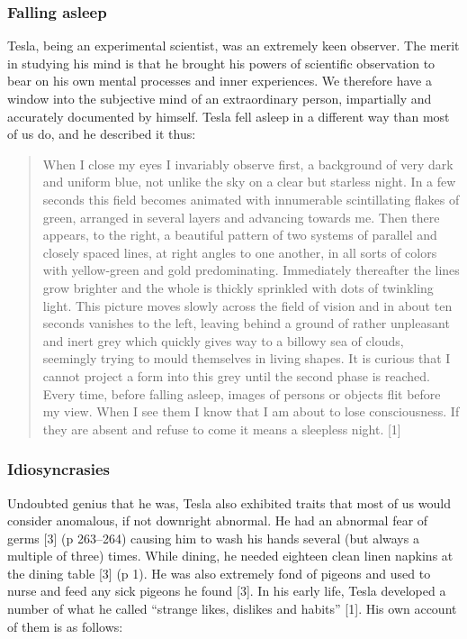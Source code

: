 \documentclass[
  12pt,
  british,
  a4paper,
]{article}
\begin{document}
\hypertarget{falling-asleep}{%
\subsubsection{Falling asleep}\label{falling-asleep}}

Tesla, being an experimental scientist, was an extremely keen observer.
The merit in studying his mind is that he brought his powers of
scientific observation to bear on his own mental processes and inner
experiences. We therefore have a window into the subjective mind of an
extraordinary person, impartially and accurately documented by himself.
Tesla fell asleep in a different way than most of us do, and he
described it thus:

\begin{quote}
When I close my eyes I invariably observe first, a background of very
dark and uniform blue, not unlike the sky on a clear but starless night.
In a few seconds this field becomes animated with innumerable
scintillating flakes of green, arranged in several layers and advancing
towards me. Then there appears, to the right, a beautiful pattern of two
systems of parallel and closely spaced lines, at right angles to one
another, in all sorts of colors with yellow-green and gold
predominating. Immediately thereafter the lines grow brighter and the
whole is thickly sprinkled with dots of twinkling light. This picture
moves slowly across the field of vision and in about ten seconds
vanishes to the left, leaving behind a ground of rather unpleasant and
inert grey which quickly gives way to a billowy sea of clouds, seemingly
trying to mould themselves in living shapes. It is curious that I cannot
project a form into this grey until the second phase is reached. Every
time, before falling asleep, images of persons or objects flit before my
view. When I see them I know that I am about to lose consciousness. If
they are absent and refuse to come it means a sleepless night. {[}1{]}
\end{quote}

\hypertarget{idiosyncrasies}{%
\subsubsection{Idiosyncrasies}\label{idiosyncrasies}}

Undoubted genius that he was, Tesla also exhibited traits that most of
us would consider anomalous, if not downright abnormal. He had an
abnormal fear of germs {[}3{]} (p 263--264) causing him to wash his
hands several (but always a multiple of three) times. While dining, he
needed eighteen clean linen napkins at the dining table {[}3{]} (p 1).
He was also extremely fond of pigeons and used to nurse and feed any
sick pigeons he found {[}3{]}. In his early life, Tesla developed a
number of what he called ``strange likes, dislikes and habits'' {[}1{]}.
His own account of them is as follows:
\end{document}
